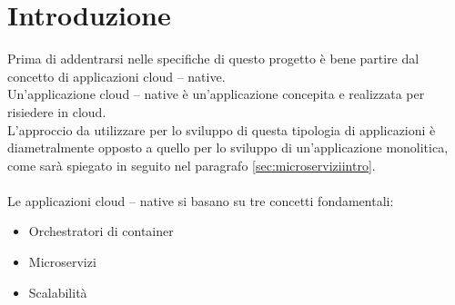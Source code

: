 \chapter*{Introduzione} %

Prima di addentrarsi nelle specifiche di questo progetto è bene partire dal concetto di applicazioni cloud – native.\\
Un'applicazione cloud – native è un'applicazione concepita e realizzata per risiedere in cloud.\\
L'approccio da utilizzare per lo sviluppo di questa tipologia di applicazioni è diametralmente opposto a quello per lo sviluppo di un'applicazione monolitica, 
come sarà spiegato in seguito nel paragrafo \ref{sec:microserviziintro}.\\
\\
Le applicazioni cloud – native si basano su tre concetti fondamentali:
\begin{itemize}
\item Orchestratori di container
\item Microservizi
\item Scalabilità
\end{itemize}


